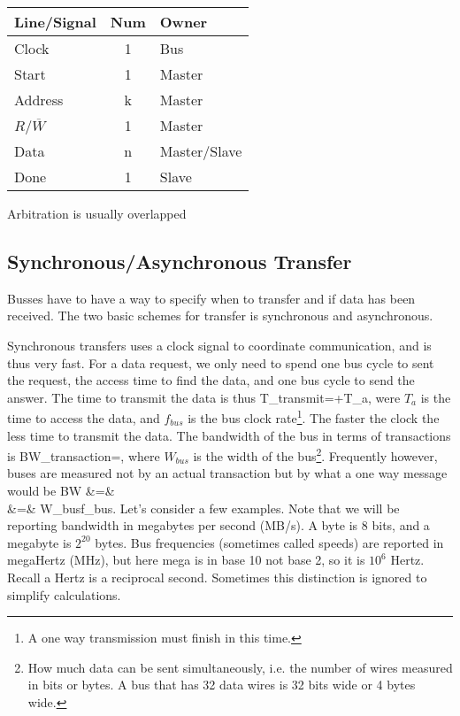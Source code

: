 \begin{tabular}{lcl}
  Line/Signal        & Num & Owner        \\ \hline
  Clock              & 1   & Bus          \\
  Start              & 1   & Master       \\
  Address            & k   & Master       \\
  $R$/$\overline{W}$ & 1   & Master       \\
  Data               & n   & Master/Slave \\
  Done               & 1   & Slave        \\
\end{tabular}

Arbitration is usually overlapped

\subsection{Synchronous/Asynchronous Transfer}

Busses have to have a way to specify when to transfer and if data
has been received.  The two basic schemes for transfer is
synchronous and asynchronous.

Synchronous transfers uses a clock signal to coordinate
communication, and is thus very fast.  For a data request, we only
need to spend one bus cycle to sent the request, the access time to
find the data, and one bus cycle to send the answer.  The time to
transmit the data is thus
\beqn
T_{transmit}=+T_a,
\eeqn
were $T_a$ is the time to access the data, and $f_{bus}$ is the bus clock rate\footnote{A one way transmission must finish in this time.}.  The faster the clock the less time to transmit the data.  The bandwidth of the bus in terms of transactions is
\beqn
BW_{transaction}=,
\eeqn
where $W_{bus}$ is the width of the bus\footnote{How much data can be sent simultaneously, i.e. the number of wires measured in bits or bytes.  A bus that has 32 data wires is 32 bits wide or 4 bytes wide.}.  Frequently however, buses are measured not by an actual transaction but by what a one way message would be
\beqn
BW &=& \\
   &=& W_{bus}f_{bus}.
\eeqn
Let's consider a few examples.  Note that we will be reporting bandwidth in megabytes per second (MB/s).  A byte is 8 bits, and a megabyte is $2^{20}$ bytes.  Bus frequencies (sometimes called speeds) are reported in megaHertz (MHz), but here mega is in base 10 not base 2, so it is $10^6$ Hertz.  Recall a Hertz is a reciprocal second.  Sometimes this distinction is ignored to simplify calculations.

